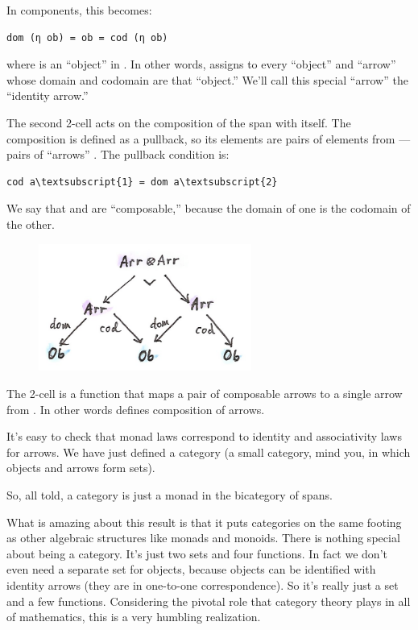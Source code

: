 \noindent
In components, this becomes:

\begin{Verbatim}[commandchars=\\\{\}]
dom (η ob) = ob = cod (η ob)
\end{Verbatim}
where  is an ``object'' in . In other words,
 assigns to every ``object'' and ``arrow'' whose domain and
codomain are that ``object.'' We'll call this special ``arrow'' the
``identity arrow.''

The second 2-cell  acts on the composition of the span
 with itself. The composition is defined as a pullback, so
its elements are pairs of elements from  --- pairs of
``arrows'' . The pullback condition is:

\begin{Verbatim}[commandchars=\\\{\}]
cod a\textsubscript{1} = dom a\textsubscript{2}
\end{Verbatim}
We say that  and  are ``composable,'' because the
domain of one is the codomain of the other.

\begin{figure}[H]
\centering
\includegraphics[width=2.75000in]{images/spanmul.png}
\end{figure}

\noindent
The 2-cell  is a function that maps a pair of composable
arrows  to a single arrow  from
. In other words  defines composition of arrows.

It's easy to check that monad laws correspond to identity and
associativity laws for arrows. We have just defined a category (a small
category, mind you, in which objects and arrows form sets).

So, all told, a category is just a monad in the bicategory of spans.

What is amazing about this result is that it puts categories on the same
footing as other algebraic structures like monads and monoids. There is
nothing special about being a category. It's just two sets and four
functions. In fact we don't even need a separate set for objects,
because objects can be identified with identity arrows (they are in
one-to-one correspondence). So it's really just a set and a few
functions. Considering the pivotal role that category theory plays in
all of mathematics, this is a very humbling realization.

